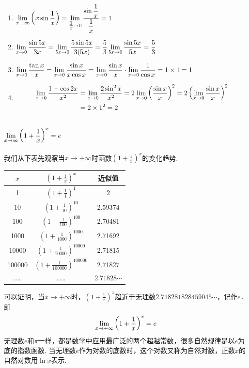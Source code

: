 \begin{solution}
\begin{enumerate}[(1)]
    \item $\lim\limits_{x\to \infty}\left(x\sin\dfrac{1}{x}\right)=\lim\limits_{\tfrac{1}{x}\to 0}\dfrac{\sin\dfrac{1}{x}}{\dfrac{1}{x}}=1$
    \item $\lim\limits_{x\to 0}\dfrac{\sin 5x}{3x}=\lim\limits_{5x\to 0}\dfrac{5\sin 5x}{3(5x)}=\dfrac{5}{3}\lim\limits_{5x\to 0}\dfrac{\sin 5x}{5x}=\dfrac{5}{3}$
    \item $\lim\limits_{x\to 0}\dfrac{\tan x}{x}=\lim\limits_{x\to 0}\dfrac{\sin x}{x\cos x}=\lim\limits_{x\to 0}\dfrac{\sin x}{x}\cdot \lim\limits_{x\to 0}\dfrac{1}{\cos x}=1\times 1=1$
    \item \[\begin{split}
        \lim\limits_{x\to 0}\dfrac{1-\cos 2x}{x^2}&=\lim\limits_{x\to 0}\dfrac{2\sin^2 x}{x^2}=2\lim\limits_{x\to 0}\left(\dfrac{\sin x}{x}\right)^2=2\left(\lim\limits_{x\to 0}\dfrac{\sin x}{x}\right)^2\\
        &=2\times 1^2=2
    \end{split}\]
\end{enumerate}
\end{solution}

\subsection{$\lim\limits_{x\to \infty}\left(1+\dfrac{1}{x}\right)^x=e$}
我们从下表先观察当$x\to +\infty$时函数$\left(1+\frac{1}{x}\right)^x$的变化趋势.

\begin{center}
\begin{tabular}{ccc}
\hline
    $x$ & $\left(1+\frac{1}{x}\right)^x$ & 近似值\\
\hline
1   &  $\left(1+\frac{1}{1}\right)^1$ & 2\\
10   &  $\left(1+\frac{1}{10}\right)^{10}$ &2.59374\\
100   &  $\left(1+\frac{1}{100}\right)^{100}$ &2.70481\\
1000   &  $\left(1+\frac{1}{1000}\right)^{1000}$ &2.71692\\
10000   &  $\left(1+\frac{1}{10000}\right)^{10000}$ &2.71815\\
100000   &  $\left(1+\frac{1}{100000}\right)^{100000}$ &2.71827\\
……&……& $2.71828\cdots$\\
\hline
\end{tabular}
\end{center}


可以证明，当$x\to +\infty$时，$\left(1+\frac{1}{x}\right)^x$趋近于无理数$2.718281828459045\cdots$，记作$e$．即
\[\lim\limits_{x\to +\infty}\left(1+\dfrac{1}{x}\right)^x=e\]
无理数$e$和$\pi$一样，都是数学中应用最广泛的两个超越常数，很多自然规律是以$e$为底的指数函数. 当无理数$e$作为对数的底数时，这个对数又称为自然对数，正数$x$的自然对数用$\ln x$表示.

